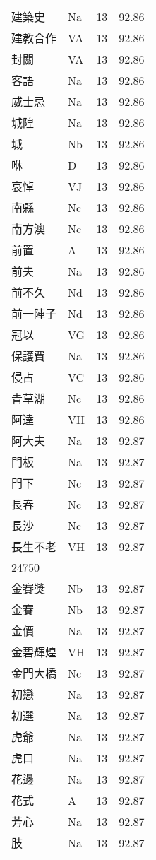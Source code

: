 \documentclass[twocolumn]{book}
\begin{document}
\begin{supertabular}{llrr}
建築史 & Na & 13 &  92.86\\
建教合作 & VA & 13 &  92.86\\
封關 & VA & 13 &  92.86\\
客語 & Na & 13 &  92.86\\
威士忌 & Na & 13 &  92.86\\
城隍 & Na & 13 &  92.86\\
城 & Nb & 13 &  92.86\\
咻 & D & 13 &  92.86\\
哀悼 & VJ & 13 &  92.86\\
南縣 & Nc & 13 &  92.86\\
南方澳 & Nc & 13 &  92.86\\
前置 & A & 13 &  92.86\\
前夫 & Na & 13 &  92.86\\
前不久 & Nd & 13 &  92.86\\
前一陣子 & Nd & 13 &  92.86\\
冠以 & VG & 13 &  92.86\\
保護費 & Na & 13 &  92.86\\
侵占 & VC & 13 &  92.86\\
青草湖 & Nc & 13 &  92.86\\
阿達 & VH & 13 &  92.86\\
阿大夫 & Na & 13 &  92.87\\
門板 & Na & 13 &  92.87\\
門下 & Nc & 13 &  92.87\\
長春 & Nc & 13 &  92.87\\
長沙 & Nc & 13 &  92.87\\
長生不老 & VH & 13 &  92.87\\
24750\\
金賽獎 & Nb & 13 &  92.87\\
金賽 & Nb & 13 &  92.87\\
金價 & Na & 13 &  92.87\\
金碧輝煌 & VH & 13 &  92.87\\
金門大橋 & Nc & 13 &  92.87\\
初戀 & Na & 13 &  92.87\\
初選 & Na & 13 &  92.87\\
虎爺 & Na & 13 &  92.87\\
虎口 & Na & 13 &  92.87\\
花邊 & Na & 13 &  92.87\\
花式 & A & 13 &  92.87\\
芳心 & Na & 13 &  92.87\\
肢 & Na & 13 &  92.87\\

\end{supertabular}
\end{document}

